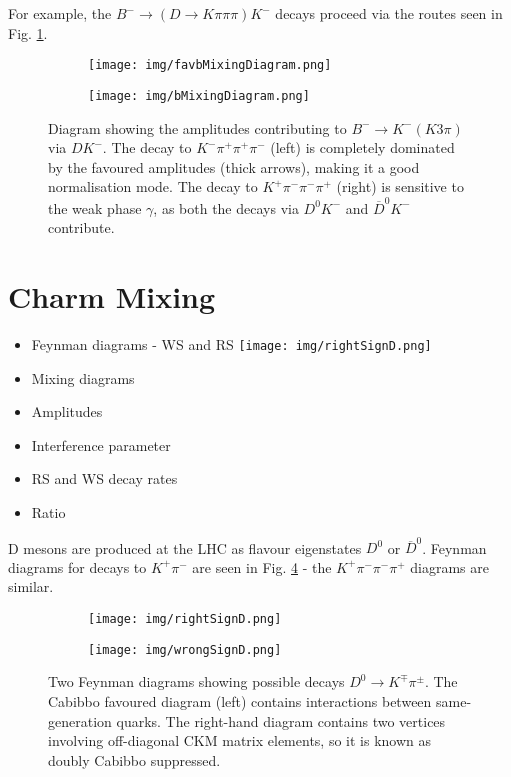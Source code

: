 \documentclass[note.tex]{subfiles}
\begin{document}
For example, the $B^- \rightarrow (D \rightarrow K \pi \pi \pi) K^-$ decays proceed via the routes seen in Fig. \ref{b mixing}.

\begin{figure}[htb!]
    \begin{subfigure}[htb!]{0.5\linewidth}
        \texttt{[image: img/favbMixingDiagram.png]}
    \end{subfigure}
    \begin{subfigure}[htb!]{0.5\linewidth}
        \texttt{[image: img/bMixingDiagram.png]}
    \end{subfigure}
    \caption{Diagram showing the amplitudes contributing to $B^-\rightarrow K^-(K3\pi)$ via $DK^-$.
        The decay to $K^-\pi^+\pi^+\pi^-$ (left) is completely dominated by the favoured amplitudes (thick arrows), making it a good normalisation mode.
        The decay to $K^+\pi^-\pi^-\pi^+$ (right) is sensitive to the weak phase $\gamma$, as both the decays via $D^0K^-$ and $\overline{D}^
0K^-$ contribute.
    }
    \label{b mixing}
\end{figure}



\section{Charm Mixing}
\begin{itemize}
    \item Feynman diagrams - WS and RS
    \texttt{[image: img/rightSignD.png]}
    \item Mixing diagrams
    \item Amplitudes
    \item Interference parameter
    \item RS and WS decay rates
    \item Ratio
\end{itemize}
D mesons are produced at the LHC as flavour eigenstates $D^0$ or $\overline{D}^0$.
Feynman diagrams for decays to $K^+ \pi^-$ are seen in Fig. \ref{d Feynman} - the $K^+ \pi^- \pi^- \pi^+$ diagrams are similar.

\begin{figure}[htb!]
    \begin{subfigure}[t]{0.5\linewidth}
        \centering
        \texttt{[image: img/rightSignD.png]}
        \caption{}
        \label{CF}
    \end{subfigure}
    \begin{subfigure}[t]{0.5\linewidth}
        \centering
        \texttt{[image: img/wrongSignD.png]}
        \caption{}
        \label{DCS}
    \end{subfigure}
    \caption{Two Feynman diagrams showing possible decays $D^0 \rightarrow K^\mp \pi^\pm$.
        The Cabibbo favoured diagram (left) contains interactions between same-generation quarks.
        The right-hand diagram contains two vertices involving off-diagonal CKM matrix elements, so it is known as doubly Cabibbo suppressed.
    }
    \label{d Feynman}
\end{figure}
\end{document}
